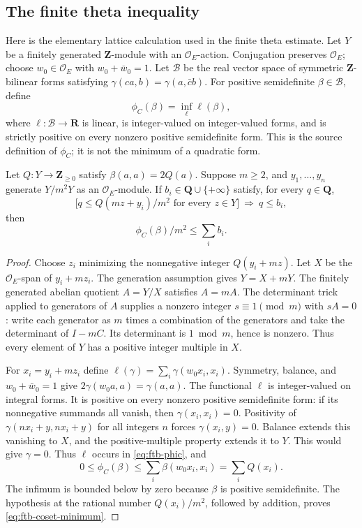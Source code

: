 \subsection{The finite theta inequality}
Here is the elementary lattice calculation used in the finite
theta estimate.  Let \(Y\) be a finitely generated
\(\mathbf Z\)-module with an \(\mathcal O_E\)-action.  Conjugation
preserves \(\mathcal O_E\); choose \(w_0\in\mathcal O_E\) with
\(w_0+\bar w_0=1\).  Let \(\mathcal B\) be the real vector space of
symmetric \(\mathbf Z\)-bilinear forms satisfying
\(\gamma(ca,b)=\gamma(a,\bar c b)\).
For positive semidefinite \(\beta\in\mathcal B\), define
\[
 \phi_C(\beta)=
 \inf_{\ell}\ell(\beta),                           \tag{C4}\label{eq:ftb-phic}
\]
where \(\ell:\mathcal B\to\mathbf R\) is linear, is integer-valued
on integer-valued forms, and is strictly positive on every nonzero
positive semidefinite form.  This is the source definition of
\(\phi_C\); it is not the minimum of a quadratic form.

\begin{srlemma}\label{lem:ftb-coset-minimum}
Let \(Q:Y\to\mathbf Z_{\geq0}\) satisfy
\(\beta(a,a)=2Q(a)\).  Suppose \(m\geq2\), and
\(y_1,\ldots,y_n\) generate \(Y/m^2Y\) as an
\(\mathcal O_E\)-module.  If \(b_i\in\mathbf Q\cup\{+\infty\}\)
satisfy, for every \(q\in\mathbf Q\),
\[
 \bigl[q\leq Q(mz+y_i)/m^2\text{ for every }z\in Y\bigr]
       \ \Longrightarrow\ q\leq b_i,
\]
then
\[
                 \phi_C(\beta)/m^2\leq\sum_i b_i .
 \tag{C5}\label{eq:ftb-coset-minimum}
\]
\end{srlemma}
\begin{proof}
Choose \(z_i\) minimizing the nonnegative integer
\(Q(y_i+mz)\).  Let \(X\) be the \(\mathcal O_E\)-span of
\(y_i+mz_i\).  The generation assumption gives \(Y=X+mY\).
The finitely generated abelian quotient \(A=Y/X\) satisfies \(A=mA\).
The determinant trick applied to generators of \(A\) supplies a
nonzero integer \(s\equiv1\pmod m\) with \(sA=0\):
write each generator as \(m\) times a combination of the generators
and take the determinant of \(I-mC\).  Its determinant is
\(1\bmod m\), hence is nonzero.  Thus every element of \(Y\) has a
positive integer multiple in \(X\).

For \(x_i=y_i+mz_i\) define
\(\ell(\gamma)=\sum_i\gamma(w_0x_i,x_i)\).
Symmetry, balance, and \(w_0+\bar w_0=1\) give
\(2\gamma(w_0a,a)=\gamma(a,a)\).
The functional \(\ell\) is integer-valued on integral forms.
It is positive on every nonzero positive semidefinite form:
if its nonnegative summands all vanish, then
\(\gamma(x_i,x_i)=0\).  Positivity of
\(\gamma(nx_i+y,nx_i+y)\) for all integers \(n\) forces
\(\gamma(x_i,y)=0\).  Balance extends this vanishing to \(X\), and
the positive-multiple property extends it to \(Y\).  This would give
\(\gamma=0\).  Thus \(\ell\) occurs in \eqref{eq:ftb-phic}, and
\[
 0\leq\phi_C(\beta)
 \leq\sum_i\beta(w_0x_i,x_i)=\sum_iQ(x_i).
\]
The infimum is bounded below by zero because \(\beta\) is
positive semidefinite.  The hypothesis at the rational number
\(Q(x_i)/m^2\), followed by addition, proves \eqref{eq:ftb-coset-minimum}.
\end{proof}

